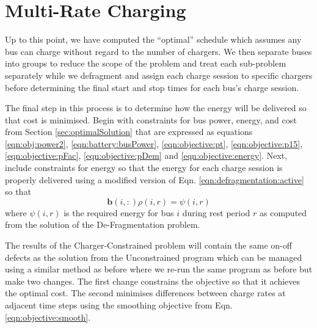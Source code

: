 \section{Multi-Rate Charging}
Up to this point, we have computed the ``optimal'' schedule which assumes any bus can charge without regard to the number of chargers. We then separate buses into groups to reduce the scope of the problem and treat each sub-problem separately while we defragment and assign each charge session to specific chargers before determining the final start and stop times for each bus's charge session.
\par The final step in this process is to determine how the energy will be delivered so that cost is minimised. Begin with constraints for bus power, energy, and cost from Section \ref{sec:optimalSolution} that are expressed as equations \ref{eqn:obj:power2}, \ref{eqn:battery:busPower}, \ref{eqn:objective:pt}, \ref{eqn:objective:p15}, \ref{eqn:objective:pFac}, \ref{eqn:objective:pDem} and \ref{eqn:objective:energy}. Next, include constraints for energy so that the energy for each charge session is properly delivered using a modified version of Eqn. \ref{eqn:defragmentation:active} so that
\begin{equation}
	\mathbf{b}(i,:)\rho(i,r) = \psi(i,r)
\end{equation}
where $\psi(i,r)$ is the required energy for bus $i$ during rest period $r$ as computed from the solution of the De-Fragmentation problem.
 \par The results of the Charger-Constrained problem will contain the same on-off defects as the solution from the Unconstrained program which can be managed using a similar method as before where we re-run the same program as before but make two changes. The first change constrains the objective so that it achieves the optimal cost. The second minimises differences between charge rates at adjacent time steps using the smoothing objective from Eqn. \ref{eqn:objective:smooth}.
